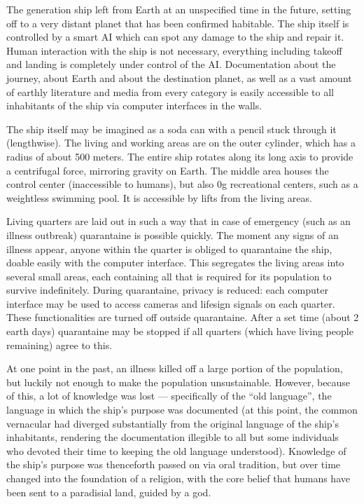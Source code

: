 \documentclass{article}
\begin{document}
The generation ship left from Earth at an unspecified time in the future, setting off to a very distant planet that has been confirmed habitable. The ship itself is controlled by a smart AI which can spot any damage to the ship and repair it. Human interaction with the ship is not necessary, everything including takeoff and landing is completely under control of the AI. Documentation about the journey, about Earth and about the destination planet, as well as a vast amount of earthly literature and media from every category is easily accessible to all inhabitants of the ship via computer interfaces in the walls.

The ship itself may be imagined as a soda can with a pencil stuck through it (lengthwise). The living and working areas are on the outer cylinder, which has a radius of about 500 meters. The entire ship rotates along its long axis to provide a centrifugal force, mirroring gravity on Earth. The middle area houses the control center (inaccessible to humans), but also 0g recreational centers, such as a weightless swimming pool. It is accessible by lifts from the living areas. 

Living quarters are laid out in such a way that in case of emergency (such as an illness outbreak) quarantaine is possible quickly. The moment any signs of an illness appear, anyone within the quarter is obliged to quarantaine the ship, doable easily with the computer interface. This segregates the living areas into several small areas, each containing all that is required for its population to survive indefinitely. During quarantaine, privacy is reduced: each computer interface may be used to access cameras and lifesign signals on each quarter. These functionalities are turned off outside quarantaine. After a set time (about 2 earth days) quarantaine may be stopped if all quarters (which have living people remaining) agree to this.

At one point in the past, an illness killed off a large portion of the population, but luckily not enough to make the population unsustainable. However, because of this, a lot of knowledge was lost — specifically of the “old language”, the language in which the ship’s purpose was documented (at this point, the common vernacular had diverged substantially from the original language of the ship’s inhabitants, rendering the documentation illegible to all but some individuals who devoted their time to keeping the old language understood). Knowledge of the ship’s purpose was thenceforth passed on via oral tradition, but over time changed into the foundation of a religion, with the core belief that humans have been sent to a paradisial land, guided by a god. 
\end{document}
